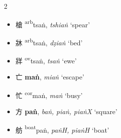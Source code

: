 \begin{multicols}{2}
\begin{itemize}
    \item {\Large{槍}} %
    {\large{{\textsuperscript{arb}}tsaṅ}},
    \textit{tshiaṅ} `spear' %
\end{itemize}

\vspace{2mm}

\begin{itemize}

 
    \item {\Large{牀}} %
    {\large{{\textsuperscript{arb}}tsaṅ}},
    \textit{dẓiaṅ} `bed' %



    \item {\Large{牂}} %
    {\large{{\textsuperscript{ov}}tsaṅ}},
    \textit{tsaṅ} `ewe' %
\end{itemize}

\vspace{2mm}

\begin{itemize}
    \item {\Large{亡}} %
    {\large{\textbf{maṅ}}},
    \textit{miaṅ} `escape' %


    \item {\Large{忙}} %
    {\large{{\textsuperscript{cor}}maṅ}},
    \textit{maṅ} `busy' %
\end{itemize}

\vspace{2mm}


\begin{itemize}
    \item {\Large{方}} %
    {\large{\textbf{paṅ}}},
    \textit{baṅ, piaṅ, piaṅX} `square'  %

    \item {\Large{舫}} %
    {\large{{\textsuperscript{boat}}paṅ}},
    \textit{paṅH, piaṅH} `boat' %
\end{itemize}
\end{multicols}

